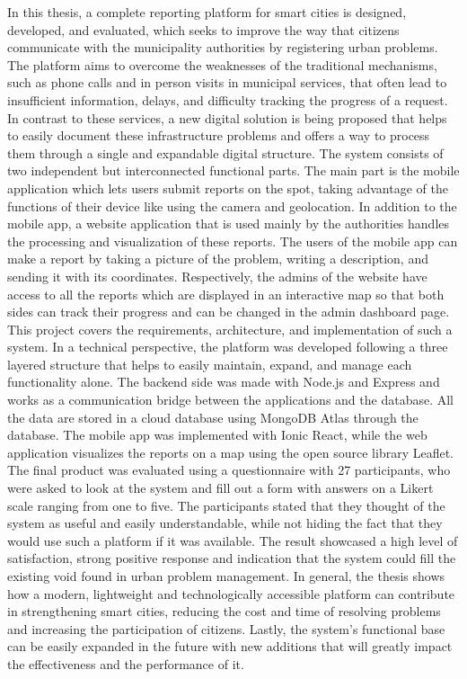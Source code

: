 In this thesis, a complete reporting platform for smart cities is designed, developed, and evaluated, which seeks to improve the way that citizens communicate with the municipality authorities by registering urban problems. The platform aims to overcome the weaknesses of the traditional mechanisms, such as phone calls and in person visits in municipal services, that often lead to insufficient information, delays, and difficulty tracking the progress of a request. In contrast to these services, a new digital solution is being proposed that helps to easily document these infrastructure problems and offers a way to process them through a single and expandable digital structure. The system consists of two independent but interconnected functional parts. The main part is the mobile application which lets users submit reports on the spot, taking advantage of the functions of their device like using the camera and geolocation. In addition to the mobile app, a website application that is used mainly by the authorities handles the processing and visualization of these reports. The users of the mobile app can make a report by taking a picture of the problem, writing a description, and sending it with its coordinates. Respectively, the admins of the website have access to all the reports which are displayed in an interactive map so that both sides can track their progress and can be changed in the admin dashboard page. This project covers the requirements, architecture, and implementation of such a system. In a technical perspective, the platform was developed following a three layered structure that helps to easily maintain, expand, and manage each functionality alone. The backend side was made with Node.js and Express and works as a communication bridge between the applications and the database. All the data are stored in a cloud database using MongoDB Atlas through the database. The mobile app was implemented with Ionic React, while the web application visualizes the reports on a map using the open source library Leaflet. The final product was evaluated using a questionnaire with 27 participants, who were asked to look at the system and fill out a form with answers on a Likert scale ranging from one to five. The participants stated that they thought of the system as useful and easily understandable, while not hiding the fact that they would use such a platform if it was available. The result showcased a high level of satisfaction, strong positive response and indication that the system could fill the existing void found in urban problem management. In general, the thesis shows how a modern, lightweight and technologically accessible platform can contribute in strengthening smart cities, reducing the cost and time of resolving problems and increasing the participation of citizens. Lastly, the system’s functional base can be easily expanded in the future with new additions that will greatly impact the effectiveness and the performance of it.
